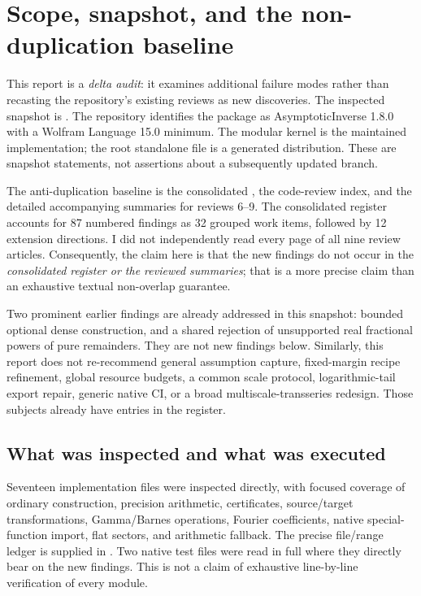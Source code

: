 \section{Scope, snapshot, and the non-duplication baseline}

This report is a \emph{delta audit}: it examines additional failure modes rather than recasting the repository's existing reviews as new discoveries. The inspected snapshot is \sha. The repository identifies the package as AsymptoticInverse 1.8.0 with a Wolfram Language 15.0 minimum. The modular kernel is the maintained implementation; the root standalone file is a generated distribution. These are snapshot statements, not assertions about a subsequently updated branch.\cite{repo,readme,status}

The anti-duplication baseline is the consolidated , the code-review index, and the detailed accompanying summaries for reviews 6--9. The consolidated register accounts for 87 numbered findings as 32 grouped work items, followed by 12 extension directions. I did not independently read every page of all nine review articles. Consequently, the claim here is that the new findings do not occur in the \emph{consolidated register or the reviewed summaries}; that is a more precise claim than an exhaustive textual non-overlap guarantee.\cite{status,reviews,review6,review7,review8,review9}

Two prominent earlier findings are already addressed in this snapshot: bounded optional dense  construction, and a shared rejection of unsupported real fractional powers of pure remainders. They are not new findings below. Similarly, this report does not re-recommend general assumption capture, fixed-margin recipe refinement, global resource budgets, a common scale protocol, logarithmic-tail export repair, generic native CI, or a broad multiscale-transseries redesign. Those subjects already have entries in the register.\cite{status}

\subsection{What was inspected and what was executed}

Seventeen implementation files were inspected directly, with focused coverage of ordinary construction, precision arithmetic, certificates, source/target transformations, Gamma/Barnes operations, Fourier coefficients, native special-function import, flat sectors, and arithmetic fallback. The precise file/range ledger is supplied in . Two native test files were read in full where they directly bear on the new findings. This is not a claim of exhaustive line-by-line verification of every module.\cite{core,cert,seriesops,flatops,flattests,certtests}

